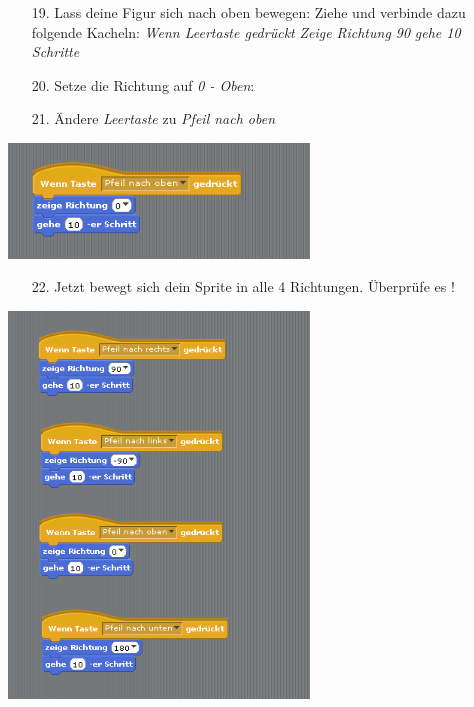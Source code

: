 \begin{itemize}
\item[19.] Lass deine Figur sich nach oben bewegen: Ziehe und verbinde dazu folgende Kacheln:
\subitem \textit{Wenn Leertaste gedrückt}
\subitem \textit{Zeige Richtung 90}
\subitem \textit{gehe 10 Schritte}
\item[20.] Setze die Richtung auf  \textit{0 - Oben}:
\item[21.] Ändere \textit{Leertaste} zu \textit{Pfeil nach oben}
\end{itemize}
\includegraphics[width=0.6\textwidth]{images/aufgabe1_oben.png}

\begin{itemize}
\item[22.] Jetzt bewegt sich dein Sprite in alle 4 Richtungen. Überprüfe es !
\end{itemize}
\includegraphics[width=0.6\textwidth]{images/aufgabe1_vier_richtungen.png}

